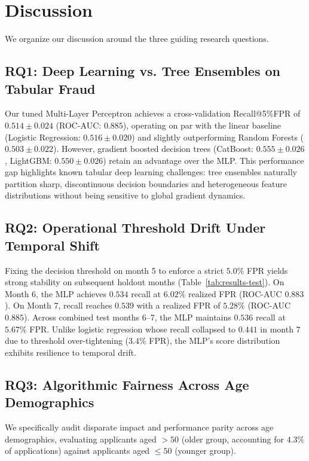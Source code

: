 
\section{Discussion}
\label{sec:discussion}

We organize our discussion around the three guiding research questions.

\subsection{RQ1: Deep Learning vs. Tree Ensembles on Tabular Fraud}
Our tuned Multi-Layer Perceptron achieves a cross-validation Recall@5\%FPR of $0.514 \pm 0.024$ (ROC-AUC: $0.885$), operating on par with the linear baseline (Logistic Regression: $0.516 \pm 0.020$) and slightly outperforming Random Forests ($0.503 \pm 0.022$). However, gradient boosted decision trees (CatBoost: $0.555 \pm 0.026$, LightGBM: $0.550 \pm 0.026$) retain an advantage over the MLP. This performance gap highlights known tabular deep learning challenges: tree ensembles naturally partition sharp, discontinuous decision boundaries and heterogeneous feature distributions without being sensitive to global gradient dynamics.

\subsection{RQ2: Operational Threshold Drift Under Temporal Shift}
Fixing the decision threshold on month 5 to enforce a strict $5.0\%$ FPR yields strong stability on subsequent holdout months (Table~\ref{tab:results-test}). On Month 6, the MLP achieves $0.534$ recall at $6.02\%$ realized FPR (ROC-AUC $0.883$). On Month 7, recall reaches $0.539$ with a realized FPR of $5.28\%$ (ROC-AUC $0.885$). Across combined test months 6--7, the MLP maintains $0.536$ recall at $5.67\%$ FPR. Unlike logistic regression whose recall collapsed to $0.441$ in month 7 due to threshold over-tightening ($3.4\%$ FPR), the MLP's score distribution exhibits resilience to temporal drift.

\subsection{RQ3: Algorithmic Fairness Across Age Demographics}
We specifically audit disparate impact and performance parity across age demographics, evaluating applicants aged $>50$ (older group, accounting for $4.3\%$ of applications) against applicants aged $\le 50$ (younger group).


